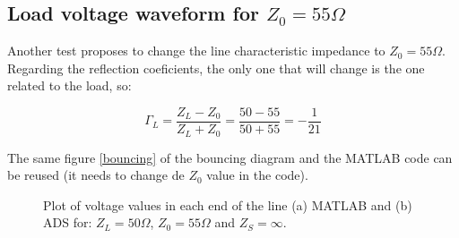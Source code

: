 \subsection{Load voltage waveform for $Z_0=55 \Omega$}

Another test proposes to change the line characteristic impedance to $Z_0=55 \Omega$. Regarding the reflection coeficients, the only one that will change is the one related to the load, so:

\begin{equation} \label{gammaL2}
    \Gamma_L= \frac{Z_L - Z_0}{Z_L + Z_0} = \frac{50 - 55}{50 + 55} = -\frac{1}{21} 
\end{equation}

The same figure \ref{bouncing} of the bouncing diagram and the MATLAB code can be reused (it needs to change de $Z_0$ value in the code).  





\begin{figure}[H]
\begin{center}
\end{center}
\caption{Plot of voltage values in each end of the line (a) MATLAB and (b) ADS for: $Z_L = 50 \Omega$, $Z_0 = 55 \Omega$ and $Z_S = \infty$.}
\label{ads:plot:voltages55} 
\end{figure}

